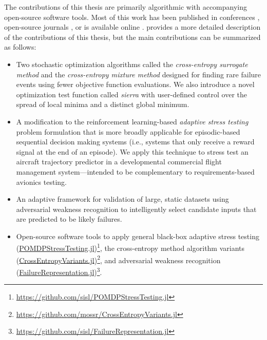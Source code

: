 The contributions of this thesis are primarily algorithmic with accompanying open-source software tools.
Most of this work has been published in conferences \cite{moss2020adaptive}, open-source journals \cite{moss2021pomdpstresstesting}, or is available online \cite{moss2020crossentropy}.
 provides a more detailed description of the contributions of this thesis, but the main contributions can be summarized as follows:

\begin{itemize}
    \item Two stochastic optimization algorithms called the \textit{cross-entropy surrogate method} and the \textit{cross-entropy mixture method} designed for finding rare failure events using fewer objective function evaluations. We also introduce a novel optimization test function called \textit{sierra} with user-defined control over the spread of local minima and a distinct global minimum.

    \item A modification to the reinforcement learning-based \textit{adaptive stress testing} problem formulation that is more broadly applicable for episodic-based sequential decision making systems (i.e., systems that only receive a reward signal at the end of an episode). We apply this technique to stress test an aircraft trajectory predictor in a developmental commercial flight management system---intended to be complementary to requirements-based avionics testing.

    \item An adaptive framework for validation of large, static datasets using adversarial weakness recognition to intelligently select candidate inputs that are predicted to be likely failures. 

    \item Open-source software tools to apply general black-box adaptive stress testing (\href{https://github.com/sisl/POMDPStressTesting.jl}{POMDPStressTesting.jl})\footnote{\url{https://github.com/sisl/POMDPStressTesting.jl}}, the cross-entropy method algorithm variants (\href{https://github.com/mossr/CrossEntropyVariants.jl}{CrossEntropyVariants.jl})\footnote{\url{https://github.com/mossr/CrossEntropyVariants.jl}}, and adversarial weakness recognition (\href{https://github.com/sisl/FailureRepresentation.jl}{FailureRepresentation.jl})\footnote{\url{https://github.com/sisl/FailureRepresentation.jl}}.
\end{itemize}

